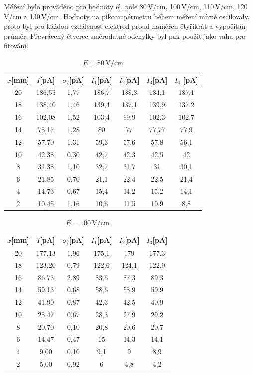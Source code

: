 \documentclass[12pt]{article}
\begin{document}
Měření bylo prováděno pro hodnoty el. pole 80\,V/cm, 100\,V/cm, 110\,V/cm, 120\,V/cm a 130\,V/cm. 
Hodnoty na pikoampérmetru během měření mírně oscilovaly, proto byl pro každou vzdálenost elektrod proud naměřen čtyřikrát a 
vypočítán průměr. Převrácený čtverec směrodatné odchylky byl pak použit jako váha pro fitování.

\begin{table}[htbp]
\begin{center}
\begin{tabular}{|c|c|c|c|c|c|c|}
\hline
$x$[mm] & $I$[pA] & $\sigma_I$[pA] & $I_1$[pA] & $I_2$[pA] & $I_3$[pA] & $I_4$ [pA] \\ \hline
20 & 186,55 & 1,77 & 186,7 & 188,3 & 184,1 & 187,1 \\ \hline
18 & 138,40 & 1,46 & 139,4 & 137,1 & 139,9 & 137,2 \\ \hline
16 & 102,08 & 1,52 & 103,4 & 99,9 & 102,3 & 102,7 \\ \hline
14 & 78,17 & 1,28 & 80 & 77 & 77,77 & 77,9 \\ \hline
12 & 57,70 & 1,31 & 59,3 & 57,6 & 57,8 & 56,1 \\ \hline
10 & 42,38 & 0,30 & 42,7 & 42,3 & 42,5 & 42 \\ \hline
8 & 31,38 & 1,10 & 32,7 & 31,7 & 31 & 30,1 \\ \hline
6 & 21,85 & 0,70 & 21,1 & 22,4 & 22,5 & 21,4 \\ \hline
4 & 14,73 & 0,67 & 15,4 & 14,2 & 15,2 & 14,1 \\ \hline
2 & 10,45 & 1,16 & 10,6 & 11,5 & 10,9 & 8,8 \\ \hline
\end{tabular}
\caption{$E = 80\,\mathrm{V/cm}$}
\label{t80}
\end{center}
\end{table}

\begin{table}[htbp]
\begin{center}
\begin{tabular}{|c|c|c|c|c|c|}
\hline
$x$[mm] & $I$[pA] & $\sigma_I$[pA] & $I_1$[pA] & $I_2$[pA] & $I_3$[pA] \\ \hline
20 & 177,13 & 1,96 & 175,1 & 179 & 177,3 \\ \hline
18 & 123,20 & 0,79 & 122,6 & 124,1 & 122,9 \\ \hline
16 & 86,73 & 2,89 & 83,6 & 87,3 & 89,3 \\ \hline
14 & 59,13 & 0,68 & 58,6 & 58,9 & 59,9 \\ \hline
12 & 41,90 & 0,87 & 42,3 & 42,5 & 40,9 \\ \hline
10 & 28,47 & 0,67 & 28,3 & 27,9 & 29,2 \\ \hline
8 & 20,70 & 0,10 & 20,8 & 20,6 & 20,7 \\ \hline
6 & 14,47 & 0,47 & 15 & 14,3 & 14,1 \\ \hline
4 & 9,00 & 0,10 & 9,1 & 9 & 8,9 \\ \hline
2 & 5,00 & 0,92 & 6 & 4,8 & 4,2 \\ \hline
\end{tabular}
\caption{$E = 100\,\mathrm{V/cm}$}
\label{t100}
\end{center}
\end{table}
\end{document}
